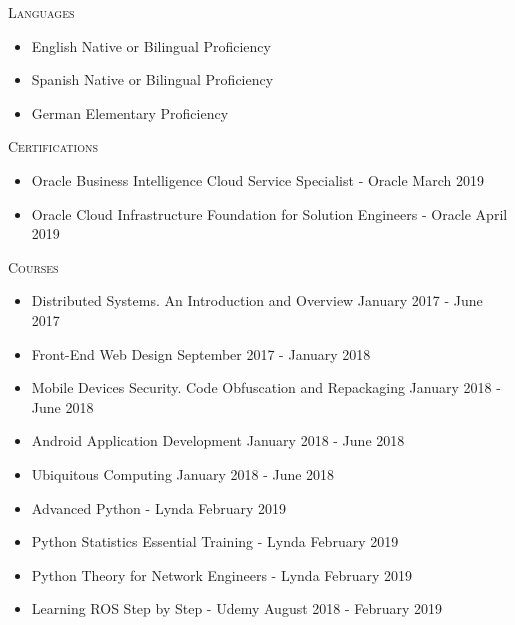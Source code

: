 \documentclass[11pt]{article}
\let\oldbibentry\bibentry
\renewcommand{\bibentry}[1]{\oldbibentry{#1}.}
\renewcommand{\section}[1]
{\vspace{1.0\baselineskip}{\Large\textbf{#1}}}
\begin{document}



\section{Skills}

\textsc{Languages}
\begin{itemize}
    \item[] English \hfill Native or Bilingual Proficiency
    \item[] Spanish \hfill Native or Bilingual Proficiency
    \item[] German \hfill Elementary Proficiency
\end{itemize}

\textsc{Certifications}
\begin{itemize}
    \item[] Oracle Business Intelligence Cloud Service Specialist - Oracle \hfill March 2019
    \item[] Oracle Cloud Infrastructure Foundation for Solution Engineers - Oracle \hfill April 2019
\end{itemize}

\textsc{Courses}
\begin{itemize}
    \item[] Distributed Systems. An Introduction and Overview \hfill January 2017 - June 2017
    \item[] Front-End Web Design \hfill September 2017 - January 2018
    \item[] Mobile Devices Security. Code Obfuscation and Repackaging \hfill January 2018 - June 2018
    \item[] Android Application Development \hfill January 2018 - June 2018
    \item[] Ubiquitous Computing \hfill January 2018 - June 2018
    \item[] Advanced Python - Lynda \hfill February 2019
    \item[] Python Statistics Essential Training - Lynda \hfill February 2019
    \item[] Python Theory for Network Engineers - Lynda \hfill February 2019
    \item[] Learning ROS Step by Step - Udemy \hfill August 2018 - February 2019
\end{itemize}
\end{document}

